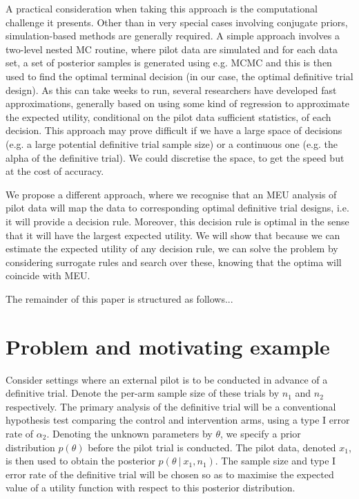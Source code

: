 \documentclass[sagev, Crown]{sagej} %
\begin{document}
A practical consideration when taking this approach is the computational challenge it presents. Other than in very special cases involving conjugate priors, simulation-based methods are generally required. A simple approach involves a two-level nested MC routine, where pilot data are simulated and for each data set, a set of posterior samples is generated using e.g. MCMC and this is then used to find the optimal terminal decision (in our case, the optimal definitive trial design). As this can take weeks to run, several researchers have developed fast approximations, generally based on using some kind of regression to approximate the expected utility, conditional on the pilot data sufficient statistics, of each decision. This approach may prove difficult if we have a large space of decisions (e.g. a large potential definitive trial sample size) or a continuous one (e.g. the alpha of the definitive trial). We could discretise the space, to get the speed but at the cost of accuracy.
\cite{Strong2014}
\cite{Strong2015}
\cite{Menzies2015}
\cite{Heath2017}
\cite{Jalal2017}
\cite{Heath2019}

We propose a different approach, where we recognise that an MEU analysis of pilot data will map the data to corresponding optimal definitive trial designs, i.e. it will provide a decision rule. Moreover, this decision rule is optimal in the sense that it will have the largest expected utility. We will show that because we can estimate the expected utility of any decision rule, we can solve the problem by considering surrogate rules and search over these, knowing that the optima will coincide with MEU. 

The remainder of this paper is structured as follows...

\section{Problem and motivating example}\label{sec:problem}

Consider settings where an external pilot is to be conducted in advance of a definitive trial. Denote the per-arm sample size of these trials by $n_1$ and $n_2$ respectively. The primary analysis of the definitive trial will be a conventional hypothesis test comparing the control and intervention arms, using a type I error rate of $\alpha_2$. Denoting the unknown parameters by $\theta$, we specify a prior distribution $p(\theta)$ before the pilot trial is conducted. The pilot data, denoted $x_1$, is then used to obtain the posterior $p(\theta ~|~ x_1, n_1)$. The sample size and type I error rate of the definitive trial will be chosen so as to maximise the expected value of a utility function with respect to this posterior distribution.
\end{document}
